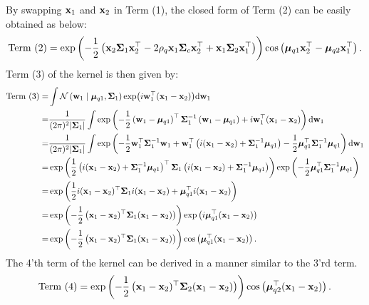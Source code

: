 By swapping \({\mathbf x}_1\) and \({\mathbf x}_2\) in Term (1), the closed form of Term (2) can be easily obtained as below:
\begin{equation}
\begin{aligned}
\text{Term (2)} = \exp \left(-\frac{1}{2}\left({\mathbf x}_2 \boldsymbol{\Sigma}_1 {\mathbf x}_2^\top - 2 \rho_q {\mathbf x}_1  \boldsymbol{\Sigma}_c {\mathbf x}_2^\top + {\mathbf x}_1 \boldsymbol{\Sigma}_2 {\mathbf x}_1^\top\right)\right) \cos \left(\boldsymbol{\mu}_{q1} {\mathbf x}_2^\top - \boldsymbol{\mu}_{q2} {\mathbf x}_1^\top\right).
\end{aligned}
\end{equation}
Term (3) of the kernel is then given by:
\begin{equation}
\begin{aligned}
\text{Term (3)} = & \int \mathcal{N}\left({\mathbf w}_1 \mid \boldsymbol{\mu}_{q1}, \boldsymbol{\Sigma}_1\right) \exp(i{\mathbf w}_1^{\top}({\mathbf x}_1-{\mathbf x}_2) ) \mathrm{d} {\mathbf w}_1 \\
= & \frac{1}{(2 \pi)^2 |\boldsymbol{\Sigma}_1|} \int \exp \left(-\frac{1}{2}\left({\mathbf w}_1 - \boldsymbol{\mu}_{q1} \right)^{\top}\boldsymbol{\Sigma}_1^{-1}\left({\mathbf w}_1-\boldsymbol{\mu}_{q1} \right)  + i{\mathbf w}_1^{\top} ({\mathbf x}_1-{\mathbf x}_2) \right) \mathrm{d} {\mathbf w}_1 \\
= & \frac{1}{(2 \pi)^2 |\boldsymbol{\Sigma}_1|} \int \exp \left(-\frac{1}{2} {\mathbf w}_1^{\top} \boldsymbol{\Sigma}_1^{-1} {\mathbf w}_1 + {\mathbf w}_1^{\top}\left(i({\mathbf x}_1-{\mathbf x}_2) + \boldsymbol{\Sigma}_1^{-1} \boldsymbol{\mu}_{q1}\right)  - \frac{1}{2} \boldsymbol{\mu}_{q1}^{\top}\boldsymbol{\Sigma}_1^{-1} \boldsymbol{\mu}_{q1}\right)  \mathrm{d} {\mathbf w}_1 \\
= & \exp \left(\frac{1}{2} \left(i({\mathbf x}_1-{\mathbf x}_2) + \boldsymbol{\Sigma}_1^{-1} \boldsymbol{\mu}_{q1}\right)^{\top}\boldsymbol{\Sigma}_1 \left(i({\mathbf x}_1-{\mathbf x}_2) + \boldsymbol{\Sigma}_1^{-1} \boldsymbol{\mu}_{q1}\right)\right)  \exp \left(-\frac{1}{2} \boldsymbol{\mu}_{q1}^{\top} \boldsymbol{\Sigma}_1^{-1} \boldsymbol{\mu}_{q1}\right) \\
= & \exp \left(\frac{1}{2} i({\mathbf x}_1-{\mathbf x}_2)^{\top}\boldsymbol{\Sigma}_1 i({\mathbf x}_1-{\mathbf x}_2) + \boldsymbol{\mu}_{q1}^{\top} i({\mathbf x}_1-{\mathbf x}_2) \right) \\
= & \exp \left(-\frac{1}{2} \left( {\mathbf x}_1-{\mathbf x}_2)^{\top} \boldsymbol{\Sigma}_1 ({\mathbf x}_1-{\mathbf x}_2) \right) \right) \exp \left( i\boldsymbol{\mu}_{q1}^{\top} ({\mathbf x}_1-{\mathbf x}_2) \right) \\
= & \exp \left(-\frac{1}{2} \left( {\mathbf x}_1-{\mathbf x}_2)^{\top}  \boldsymbol{\Sigma}_1 ({\mathbf x}_1-{\mathbf x}_2)\right) \right) \cos \left( \boldsymbol{\mu}_{q1}^{\top} ({\mathbf x}_1 -  {\mathbf x}_2 )\right).
\end{aligned}
\end{equation}
The 4'th term of the kernel can be derived in a manner similar to the 3'rd term.
\begin{equation}
\begin{aligned}
\text{Term (4)} =  \exp \left(-\frac{1}{2} \left( {\mathbf x}_1-{\mathbf x}_2)^{\top} \boldsymbol{\Sigma}_2 ({\mathbf x}_1-{\mathbf x}_2) \right) \right) \cos \left( \boldsymbol{\mu}_{q2}^{\top} ({\mathbf x}_1 -  {\mathbf x}_2 )\right).
\end{aligned}
\end{equation}

